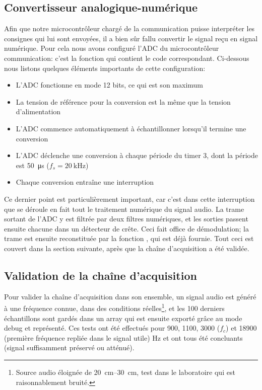 \subsection{Convertisseur analogique-numérique}
Afin que notre microcontrôleur chargé de la communication puisse interpréter les consignes qui lui sont envoyées, il a bien sûr fallu convertir le signal reçu en signal numérique. Pour cela nous avons configuré l'ADC du microcontrôleur communication: c'est la fonction  qui contient le code correspondant. Ci-dessous nous listons quelques éléments importants de cette configuration:
\begin{itemize}
\item L'ADC fonctionne en mode 12 bits, ce qui est son maximum
\item La tension de référence pour la conversion est la même que la tension d'alimentation
\item L'ADC commence automatiquement à échantillonner lorsqu'il termine une conversion
\item L'ADC déclenche une conversion à chaque période du timer 3, dont la période est \SI{50}{\micro\second} ($f_s = \SI{20}{\kilo\hertz}$)
\item Chaque conversion entraîne une interruption
\end{itemize}
Ce dernier point est particulièrement important, car c'est dans cette interruption que se déroule en fait tout le traitement numérique du signal audio. La trame sortant de l'ADC y est filtrée par deux filtres numériques, et les sorties passent ensuite chacune dans un détecteur de crête. Ceci fait office de démodulation; la trame est ensuite reconstituée par la fonction , qui est déjà fournie. Tout ceci est couvert dans la section suivante, après que la chaîne d'acquisition a été validée.

\subsection{Validation de la chaîne d'acquisition}

Pour valider la chaîne d'acquisition dans son ensemble, un signal audio est généré à une fréquence connue, dans des conditions réelles\footnote{Source audio éloignée de \SIrange{20}{30}{\centi\meter}, test dans le laboratoire qui est raisonnablement bruité.}, et les 100 derniers échantillons sont gardés dans un array qui est ensuite exporté grâce au mode debug et représenté. Ces tests ont été effectués pour 900, 1100, 3000 ($f_c$) et 18900 (première fréquence repliée dans le signal utile) \si{\hertz} et ont tous été concluants (signal suffisamment préservé ou atténué).

